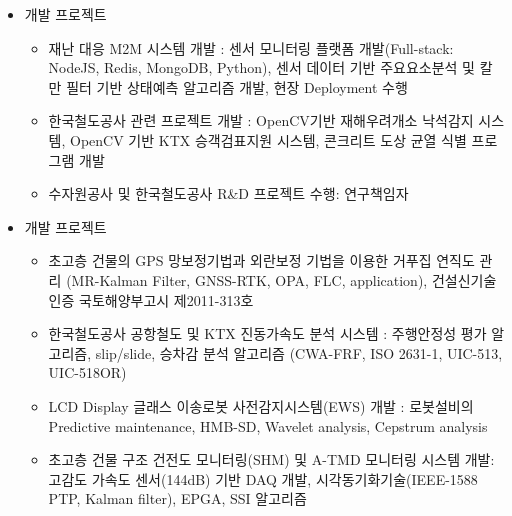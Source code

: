 \begin{itemize}[label=]
	\item 개발 프로젝트
	      \begin{itemize}[label=]
		      \item 재난 대응 M2M 시스템 개발 \hyperref[m2m]{\space {}}: 센서 모니터링 플랫폼 개발(Full-stack: NodeJS, Redis, MongoDB, Python), 센서 데이터 기반 주요요소분석 및 칼만 필터 기반 상태예측 알고리즘 개발, 현장 Deployment 수행
		      \item 한국철도공사 관련 프로젝트 개발 \hyperref[korail]{\space {}}: OpenCV기반 재해우려개소 낙석감지 시스템, OpenCV 기반 KTX 승객검표지원 시스템, 콘크리트 도상 균열 식별 프로그램 개발
		      \item 수자원공사 및 한국철도공사 R\&D 프로젝트 수행: 연구책임자
	      \end{itemize}
\end{itemize}

\divider

\begin{itemize}[label=]
	\item 개발 프로젝트
	      \begin{itemize}[label=]
		      \item 초고층 건물의 GPS 망보정기법과 외란보정 기법을 이용한 거푸집 연직도 관리 \hyperref[gnss]{\space {}} (MR-Kalman Filter, GNSS-RTK, OPA, FLC, application), 건설신기술 인증 국토해양부고시 제2011-313호
		      \item 한국철도공사 공항철도 및 KTX 진동가속도 분석 시스템 \hyperref[arex]{\space {}}: 주행안정성 평가 알고리즘, slip/slide, 승차감 분석 알고리즘 (CWA-FRF, ISO 2631-1, UIC-513, UIC-518OR)
		      \item LCD Display 글래스 이송로봇 사전감지시스템(EWS) 개발 \hyperref[lgdisplay]{\space {}}: 로봇설비의 Predictive maintenance, HMB-SD, Wavelet analysis, Cepstrum analysis
		      \item 초고층 건물 구조 건전도 모니터링(SHM) \hyperref[shm]{\space {}} 및 A-TMD 모니터링 시스템 개발: 고감도 가속도 센서(144dB) 기반 DAQ 개발, 시각동기화기술(IEEE-1588 PTP, Kalman filter), EPGA, SSI 알고리즘
	      \end{itemize}
\end{itemize}